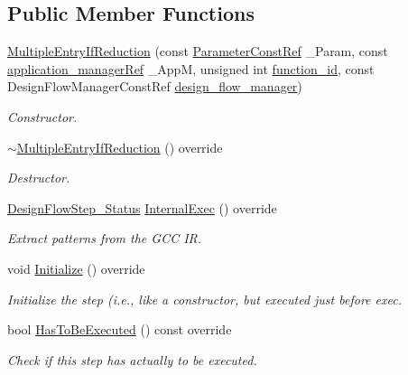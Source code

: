 \subsection*{Public Member Functions}
\begin{DoxyCompactItemize}
\item 
\hyperlink{classMultipleEntryIfReduction_a6e3f904467d49c19ab6b7a77bef40453}{Multiple\+Entry\+If\+Reduction} (const \hyperlink{Parameter_8hpp_a37841774a6fcb479b597fdf8955eb4ea}{Parameter\+Const\+Ref} \+\_\+\+Param, const \hyperlink{application__manager_8hpp_a04ccad4e5ee401e8934306672082c180}{application\+\_\+manager\+Ref} \+\_\+\+AppM, unsigned int \hyperlink{classFunctionFrontendFlowStep_a58ef2383ad1a212a8d3f396625a4b616}{function\+\_\+id}, const Design\+Flow\+Manager\+Const\+Ref \hyperlink{classDesignFlowStep_ab770677ddf087613add30024e16a5554}{design\+\_\+flow\+\_\+manager})
\begin{DoxyCompactList}\small\item\em Constructor. \end{DoxyCompactList}\item 
\hyperlink{classMultipleEntryIfReduction_aef9622ec9e0fce7e942b6746c383ad72}{$\sim$\+Multiple\+Entry\+If\+Reduction} () override
\begin{DoxyCompactList}\small\item\em Destructor. \end{DoxyCompactList}\item 
\hyperlink{design__flow__step_8hpp_afb1f0d73069c26076b8d31dbc8ebecdf}{Design\+Flow\+Step\+\_\+\+Status} \hyperlink{classMultipleEntryIfReduction_abde81c971e9b10ba0626e3c068249fbe}{Internal\+Exec} () override
\begin{DoxyCompactList}\small\item\em Extract patterns from the G\+CC IR. \end{DoxyCompactList}\item 
void \hyperlink{classMultipleEntryIfReduction_adbaeee425a62fdee6e6723ce59a4cf2a}{Initialize} () override
\begin{DoxyCompactList}\small\item\em Initialize the step (i.\+e., like a constructor, but executed just before exec. \end{DoxyCompactList}\item 
bool \hyperlink{classMultipleEntryIfReduction_a0aed1493c46ae158341d4dffef7aae62}{Has\+To\+Be\+Executed} () const override
\begin{DoxyCompactList}\small\item\em Check if this step has actually to be executed. \end{DoxyCompactList}\end{DoxyCompactItemize}
